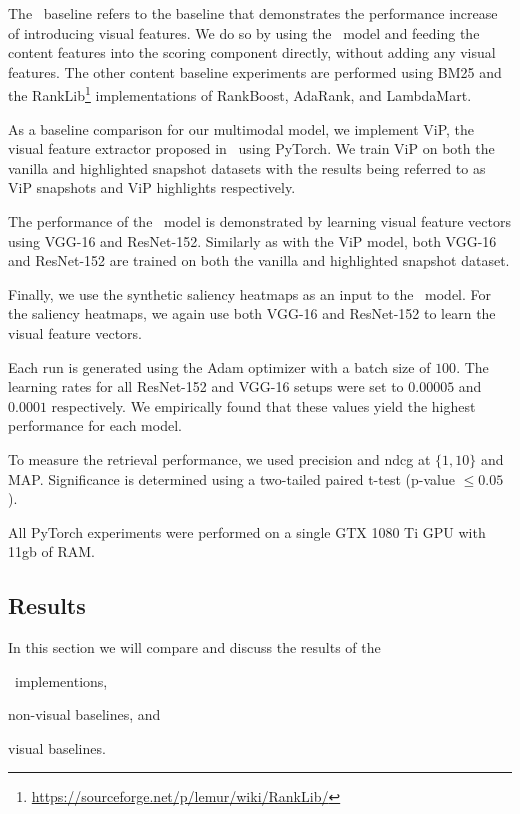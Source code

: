 The \modelname~baseline refers to the baseline that demonstrates the performance increase of introducing visual features. We do so by using the \modelname~model and feeding the content features into the scoring component directly, without adding any visual features. 
The other content baseline experiments are performed using BM25 and the RankLib\footnote{\url{https://sourceforge.net/p/lemur/wiki/RankLib/}} implementations of RankBoost, AdaRank, and LambdaMart.

As a baseline comparison for our multimodal model, we implement ViP, the visual feature extractor proposed in~\citet{fan2017learning} using PyTorch. We train ViP on both the vanilla and highlighted snapshot datasets with the results being referred to as ViP snapshots and ViP highlights respectively.

The performance of the \modelname~model is demonstrated by learning visual feature vectors using VGG-16 and ResNet-152. Similarly as with the ViP model, both VGG-16 and ResNet-152 are trained on both the vanilla and highlighted snapshot dataset. 

Finally, we use the synthetic saliency heatmaps as an input to the \modelname~model. For the saliency heatmaps, we again use both VGG-16 and ResNet-152 to learn the visual feature vectors.

Each run is generated using the Adam optimizer with a batch size of $100$. The learning rates for all ResNet-152 and VGG-16 setups were set to $0.00005$ and $0.0001$ respectively. We empirically found that these values yield the highest performance for each model.

To measure the retrieval performance, we used precision and ndcg at $\{1,10\}$ and MAP.
Significance is determined using a two-tailed paired t-test (p-value $\leq 0.05$). 

All PyTorch experiments were performed on a single GTX 1080 Ti GPU with 11gb of RAM. 


\subsection{Results}
In this section we will compare and discuss the results of the 
\begin{inparaenum}[(i)]
\item \modelname~implementions, 
\item non-visual baselines, and 
\item visual baselines.
\end{inparaenum}  


